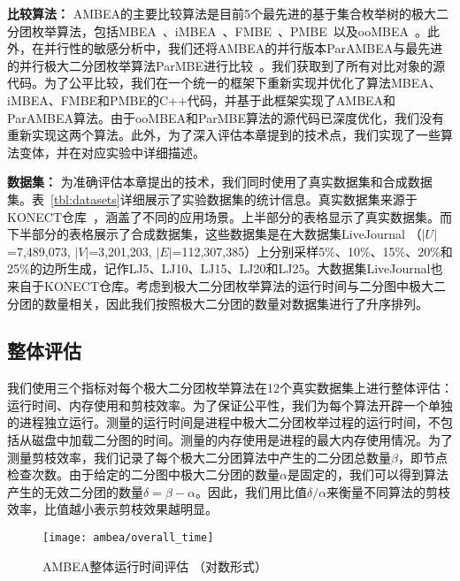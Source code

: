 \textbf{比较算法：} AMBEA的主要比较算法是目前5个最先进的基于集合枚举树的极大二分团枚举算法，包括MBEA~\cite{iMBEA14}、iMBEA~\cite{iMBEA14}、FMBE~\cite{parMBE18}、PMBE~\cite{PMBE20}以及ooMBEA~\cite{ooMBE22}。此外，在并行性的敏感分析中，我们还将AMBEA的并行版本ParAMBEA与最先进的并行极大二分团枚举算法ParMBE进行比较~\cite{parMBE18}。我们获取到了所有对比对象的源代码。为了公平比较，我们在一个统一的框架下重新实现并优化了算法MBEA、iMBEA、FMBE和PMBE的C++代码，并基于此框架实现了AMBEA和ParAMBEA算法。由于ooMBEA和ParMBE算法的源代码已深度优化，我们没有重新实现这两个算法。此外，为了深入评估本章提到的技术点，我们实现了一些算法变体，并在对应实验中详细描述。

 

\textbf{数据集：} 为准确评估本章提出的技术，我们同时使用了真实数据集和合成数据集。表~\ref{tbl:datasets}详细展示了实验数据集的统计信息。真实数据集来源于KONECT仓库~\cite{konect}，涵盖了不同的应用场景。上半部分的表格显示了真实数据集。而下半部分的表格展示了合成数据集，这些数据集是在大数据集LiveJournal （$|U|$=7,489,073, $|V|$=3,201,203, $|E|$=112,307,385）上分别采样5\%、10\%、15\%、20\%和25\%的边所生成，记作LJ5、LJ10、LJ15、LJ20和LJ25。大数据集LiveJournal也来自于KONECT仓库。考虑到极大二分团枚举算法的运行时间与二分图中极大二分团的数量相关，因此我们按照极大二分团的数量对数据集进行了升序排列。

\subsection{整体评估}
\label{subsec:ambea_exp_overall}

我们使用三个指标对每个极大二分团枚举算法在12个真实数据集上进行整体评估：运行时间、内存使用和剪枝效率。为了保证公平性，我们为每个算法开辟一个单独的进程独立运行。测量的运行时间是进程中极大二分团枚举过程的运行时间，不包括从磁盘中加载二分图的时间。测量的内存使用是进程的最大内存使用情况。为了测量剪枝效率，我们记录了每个极大二分团算法中产生的二分团总数量$\beta$，即节点检查次数。由于给定的二分图中极大二分团的数量$\alpha$是固定的，我们可以得到算法产生的无效二分团的数量$\delta=\beta-\alpha$。因此，我们用比值$\delta/\alpha$来衡量不同算法的剪枝效率，比值越小表示剪枝效果越明显。

\begin{figure} [H]
  \centering
  \vspace{0.1in}
  \texttt{[image: ambea/overall\_time]}
  \caption{AMBEA整体运行时间评估 （对数形式）}
  \label{fig:ambea_overall_time}
\end{figure}


